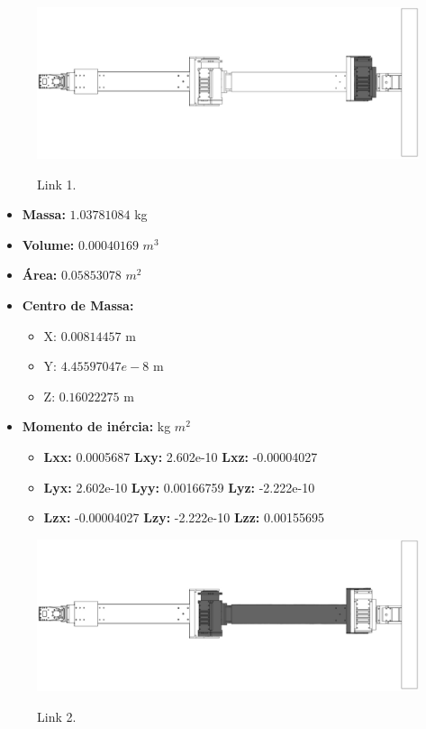 \documentclass[
12pt,					%
openright,				%
twoside,				%
a4paper,				%
english,
brazil
]{ABNT/abntex2_report}
\begin{document}
	\begin{figure}[H]
		\centering
		\caption{Link 1.}
		\includegraphics[scale=1.2]{appendix/link1.jpg}
		\label{fig:link1}
	\end{figure}

	\begin{itemize}
		\item \textbf{Massa:} $1.03781084$ kg
		\item \textbf{Volume:} $0.00040169$  $m^{3}$
		\item \textbf{Área:} $0.05853078$  $m^{2}$
		\item \textbf{Centro de  Massa:}
		\begin{itemize}
			\item X: $0.00814457$ m
			\item Y: $4.45597047e-8$ m
			\item Z: $0.16022275$ m
		\end{itemize}
		\item \textbf{Momento de inércia:} kg $m^{2}$
		\begin{itemize}
			\item \textbf{Lxx:}	0.0005687 \textbf{Lxy:} 2.602e-10 \textbf{Lxz:}	-0.00004027			
			\item \textbf{Lyx:} 2.602e-10 \textbf{Lyy:} 0.00166759 \textbf{Lyz:} -2.222e-10		
			\item \textbf{Lzx:} -0.00004027 \textbf{Lzy:} -2.222e-10 \textbf{Lzz:} 0.00155695			
		\end{itemize}	
	\end{itemize}
	

	\begin{figure}[H]
		\centering
		\caption{Link 2.}
		\includegraphics[scale=1.2]{appendix/link2.jpg}
		\label{fig:link2}
	\end{figure}
\end{document}
